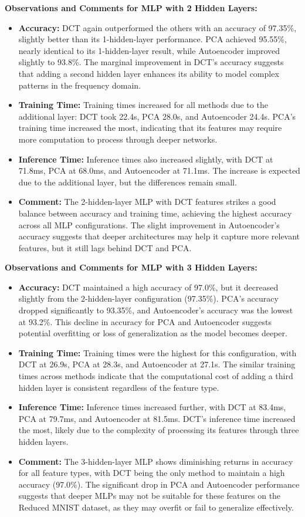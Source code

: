 \documentclass[a4paper,12pt]{article}
\begin{document}
\textbf{Observations and Comments for MLP with 2 Hidden Layers:}
\begin{itemize}
    \item \textbf{Accuracy:} DCT again outperformed the others with an accuracy of 97.35\%, slightly better than its 1-hidden-layer performance. PCA achieved 95.55\%, nearly identical to its 1-hidden-layer result, while Autoencoder improved slightly to 93.8\%. The marginal improvement in DCT's accuracy suggests that adding a second hidden layer enhances its ability to model complex patterns in the frequency domain.
    \item \textbf{Training Time:} Training times increased for all methods due to the additional layer: DCT took 22.4s, PCA 28.0s, and Autoencoder 24.4s. PCA's training time increased the most, indicating that its features may require more computation to process through deeper networks.
    \item \textbf{Inference Time:} Inference times also increased slightly, with DCT at 71.8ms, PCA at 68.0ms, and Autoencoder at 71.1ms. The increase is expected due to the additional layer, but the differences remain small.
    \item \textbf{Comment:} The 2-hidden-layer MLP with DCT features strikes a good balance between accuracy and training time, achieving the highest accuracy across all MLP configurations. The slight improvement in Autoencoder's accuracy suggests that deeper architectures may help it capture more relevant features, but it still lags behind DCT and PCA.
\end{itemize}

\textbf{Observations and Comments for MLP with 3 Hidden Layers:}
\begin{itemize}
    \item \textbf{Accuracy:} DCT maintained a high accuracy of 97.0\%, but it decreased slightly from the 2-hidden-layer configuration (97.35\%). PCA's accuracy dropped significantly to 93.35\%, and Autoencoder's accuracy was the lowest at 93.2\%. This decline in accuracy for PCA and Autoencoder suggests potential overfitting or loss of generalization as the model becomes deeper.
    \item \textbf{Training Time:} Training times were the highest for this configuration, with DCT at 26.9s, PCA at 28.3s, and Autoencoder at 27.1s. The similar training times across methods indicate that the computational cost of adding a third hidden layer is consistent regardless of the feature type.
    \item \textbf{Inference Time:} Inference times increased further, with DCT at 83.4ms, PCA at 79.7ms, and Autoencoder at 81.5ms. DCT's inference time increased the most, likely due to the complexity of processing its features through three hidden layers.
    \item \textbf{Comment:} The 3-hidden-layer MLP shows diminishing returns in accuracy for all feature types, with DCT being the only method to maintain a high accuracy (97.0\%). The significant drop in PCA and Autoencoder performance suggests that deeper MLPs may not be suitable for these features on the Reduced MNIST dataset, as they may overfit or fail to generalize effectively.
\end{itemize}
\end{document}
